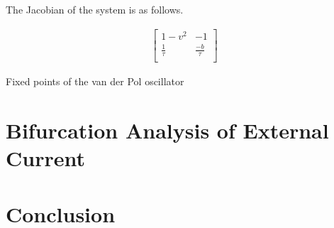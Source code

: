 \documentclass{article}
\begin{document}
The Jacobian of the system is as follows.

\begin{align*}
\begin{bmatrix}
    1-v^2      & -1 \\
    \frac{1}{\tau}       & \frac{-b}{\tau} \\
\end{bmatrix}
\end{align*}

Fixed points of the van der Pol oscillator

\section{Bifurcation Analysis of External Current}


\section{Conclusion}





\nocite{*}
\end{document}
